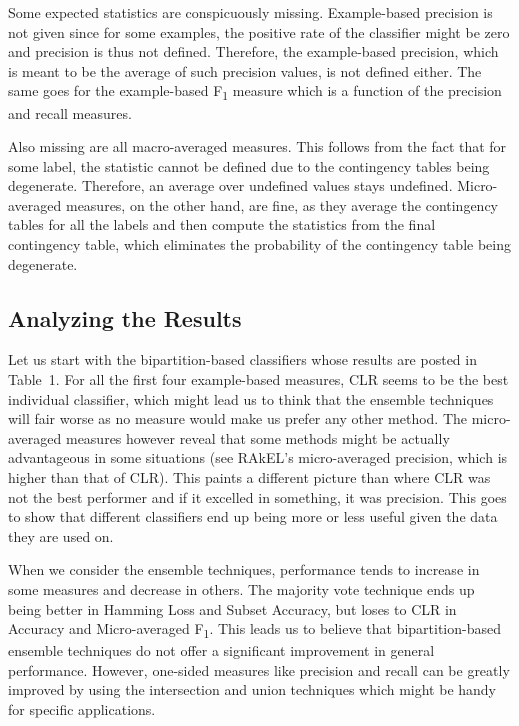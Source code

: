 Some expected statistics are conspicuously missing. Example-based
precision is not given since for some examples, the positive rate of
the classifier might be zero and precision is thus not
defined. Therefore, the example-based precision, which is meant to be
the average of such precision values, is not defined either. The same
goes for the example-based F\textsubscript{1} measure which is a
function of the precision and recall measures.

Also missing are all macro-averaged measures. This follows from the
fact that for some label, the statistic cannot be defined due to the
contingency tables being degenerate. Therefore, an average over
undefined values stays undefined. Micro-averaged measures, on the
other hand, are fine, as they average the contingency tables for all
the labels and then compute the statistics from the final contingency
table, which eliminates the probability of the contingency table being
degenerate.

\subsection*{Analyzing the Results}

Let us start with the bipartition-based classifiers whose results are
posted in Table~1. For all the first four example-based measures, CLR
seems to be the best individual classifier, which might lead us to
think that the ensemble techniques will fair worse as no measure would
make us prefer any other method. The micro-averaged measures however
reveal that some methods might be actually advantageous in some
situations (see RAkEL's micro-averaged precision, which is higher than
that of CLR). This paints a different picture than
\cite{sanden2011enhancing} where CLR was not the best performer and if
it excelled in something, it was precision. This goes to show that
different classifiers end up being more or less useful given the data
they are used on.

When we consider the ensemble techniques, performance tends to
increase in some measures and decrease in others. The majority vote
technique ends up being better in Hamming Loss and Subset Accuracy,
but loses to CLR in Accuracy and Micro-averaged
F\textsubscript{1}. This leads us to believe that bipartition-based
ensemble techniques do not offer a significant improvement in general
performance. However, one-sided measures like precision and recall can
be greatly improved by using the intersection and union techniques
which might be handy for specific applications.


